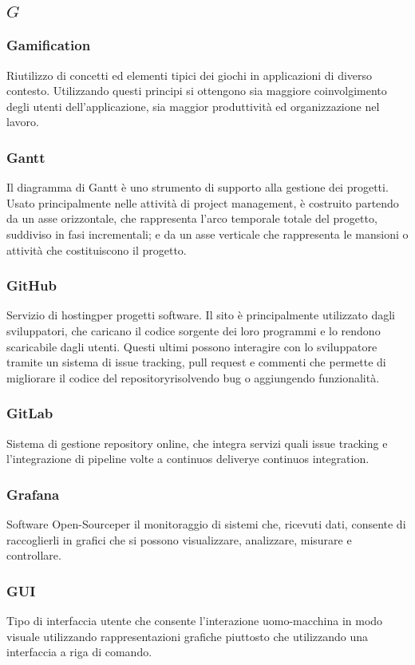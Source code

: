 \subsection*{\quad$G\quad$}
\subsubsection*{Gamification}
Riutilizzo di concetti ed elementi tipici dei giochi in applicazioni di diverso contesto. Utilizzando questi principi si ottengono sia maggiore coinvolgimento degli utenti dell'applicazione, sia maggior produttività ed organizzazione nel lavoro.

\subsubsection*{Gantt}
Il diagramma di Gantt è uno strumento di supporto alla gestione dei progetti. Usato principalmente nelle attività di project management, è costruito partendo da un asse orizzontale, che rappresenta l'arco temporale totale del progetto, suddiviso in fasi incrementali; e da un asse
verticale che rappresenta le mansioni o attività che costituiscono il progetto.

\subsubsection*{GitHub}
Servizio di hosting\glosp per progetti software. Il sito è principalmente utilizzato dagli sviluppatori, che caricano il codice sorgente dei loro programmi e lo rendono scaricabile dagli utenti. Questi ultimi possono interagire con lo sviluppatore tramite un sistema di issue tracking, pull request e commenti che permette di migliorare il codice del repository\glosp risolvendo bug o aggiungendo funzionalità.

\subsubsection*{GitLab}
Sistema di gestione repository online, che integra servizi quali issue tracking e l’integrazione di pipeline volte a continuos delivery\glosp e continuos integration\glo.

\subsubsection*{Grafana}
Software Open-Source\glosp per il monitoraggio di sistemi che, ricevuti dati, consente di raccoglierli in grafici che si possono visualizzare, analizzare, misurare e controllare.

\subsubsection*{GUI}
Tipo di interfaccia utente che consente l'interazione uomo-macchina in modo visuale utilizzando rappresentazioni grafiche piuttosto che utilizzando una interfaccia a riga di comando.


